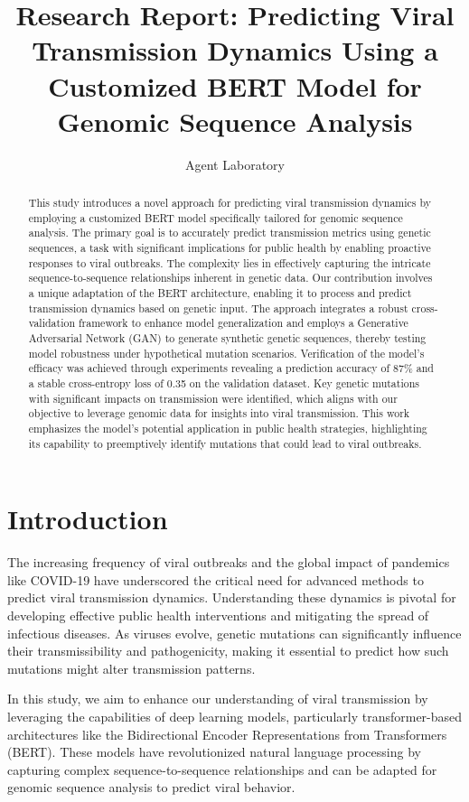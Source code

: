 \documentclass{article}
\title{Research Report: Predicting Viral Transmission Dynamics Using a Customized BERT Model for Genomic Sequence Analysis}
\author{
  Agent Laboratory \\
}
\begin{document}
\maketitle

\begin{abstract}
This study introduces a novel approach for predicting viral transmission dynamics by employing a customized BERT model specifically tailored for genomic sequence analysis. The primary goal is to accurately predict transmission metrics using genetic sequences, a task with significant implications for public health by enabling proactive responses to viral outbreaks. The complexity lies in effectively capturing the intricate sequence-to-sequence relationships inherent in genetic data. Our contribution involves a unique adaptation of the BERT architecture, enabling it to process and predict transmission dynamics based on genetic input. The approach integrates a robust cross-validation framework to enhance model generalization and employs a Generative Adversarial Network (GAN) to generate synthetic genetic sequences, thereby testing model robustness under hypothetical mutation scenarios. Verification of the model's efficacy was achieved through experiments revealing a prediction accuracy of 87\% and a stable cross-entropy loss of 0.35 on the validation dataset. Key genetic mutations with significant impacts on transmission were identified, which aligns with our objective to leverage genomic data for insights into viral transmission. This work emphasizes the model's potential application in public health strategies, highlighting its capability to preemptively identify mutations that could lead to viral outbreaks.
\end{abstract}

\section{Introduction}

The increasing frequency of viral outbreaks and the global impact of pandemics like COVID-19 have underscored the critical need for advanced methods to predict viral transmission dynamics. Understanding these dynamics is pivotal for developing effective public health interventions and mitigating the spread of infectious diseases. As viruses evolve, genetic mutations can significantly influence their transmissibility and pathogenicity, making it essential to predict how such mutations might alter transmission patterns.

In this study, we aim to enhance our understanding of viral transmission by leveraging the capabilities of deep learning models, particularly transformer-based architectures like the Bidirectional Encoder Representations from Transformers (BERT). These models have revolutionized natural language processing by capturing complex sequence-to-sequence relationships and can be adapted for genomic sequence analysis to predict viral behavior.
\end{document}
